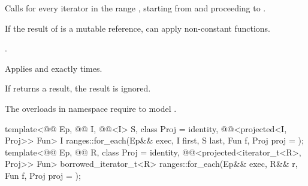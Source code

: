 \begin{itemdescr}
\pnum
\effects
Calls 
for every iterator  in the range ,
starting from  and proceeding to .
\begin{note}
If the result of  is a mutable reference,
 can apply non-constant functions.
\end{note}

\pnum
\returns
{}.

\pnum
\complexity
Applies  and  exactly  times.

\pnum
\remarks
If  returns a result, the result is ignored.

\pnum
\begin{note}
The overloads in namespace  require
 to model .
\end{note}
\end{itemdescr}

\begin{itemdecl}
template<@@ Ep, @@ I, @@<I> S,
          class Proj = identity,
          @@<projected<I, Proj>> Fun>
  I ranges::for_each(Ep&& exec, I first, S last, Fun f, Proj proj = {});
template<@@ Ep, @@ R, class Proj = identity,
         @@<projected<iterator_t<R>, Proj>> Fun>
  borrowed_iterator_t<R>
    ranges::for_each(Ep&& exec, R&& r, Fun f, Proj proj = {});
\end{itemdecl}

